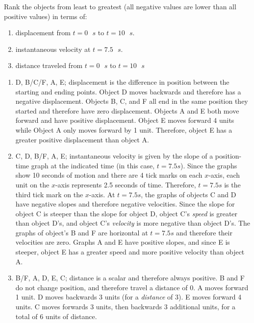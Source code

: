 \begin{Exercise}[label = graphs]
Rank the objects from least to greatest (all negative values are lower than 
all positive values) in terms of:
\begin{enumerate}
    \item displacement from $t = 0\text{ }s$ to $t = 10\text{ }s$.
    \item instantaneous velocity at $t = 7.5\text{ }s$.
    \item {}distance traveled from $t = 0\text{ }s$ to $t = 10\text{ }s$
\end{enumerate}
\end{Exercise}

\begin{Answer}[ref = graphs]
\begin{enumerate}
	\item D, B/C/F, A, E; displacement is the difference in position between the 
	starting and ending points. Object D moves backwards and therefore has a 
	negative displacement. Objects B, C, and F all end in the same position they 
	started and therefore have zero displacement. Objects A and E both move 
	forward and have positive displacement. Object E moves forward 4 units while 
	Object A only moves forward by 1 unit. Therefore, object E has a greater 
	positive displacement than object A.  
	\item C, D, B/F, A, E; instantaneous velocity is given by the slope of a 
	position-time graph at the indicated time (in this case, $t = 7.5s$). Since 
	the graphs show 10 seconds of motion and there are 4 tick marks on each 
	$x$-axis, each unit on the $x$-axis represents 2.5 seconds of time. Therefore, 
	$t = 7.5s$ is the third tick mark on the $x$-axis. At $t = 7.5s$, the graphs of 
	objects C and D have negative slopes and therefore negative velocities. Since 
	the slope for object C is steeper than the slope for object D, object C's 
	\textit{speed} is greater than object D's, and object C's \textit{velocity} 
	is more negative than object D's. The graphs of object's B and F are horizontal 
	at $t=7.5s$ and therefore their velocities are zero. Graphs A and E have 
	positive slopes, and since E is steeper, object E has a greater speed and 
	more positive velocity than object A. 
	\item B/F, A, D, E, C; distance is a scalar and therefore always positive. B 
	and F do not change position, and therefore travel a distance of 0. A moves 
	forward 1 unit. D moves backwards 3 units (for a \textit{distance} of 3). E 
	moves forward 4 units. C moves forwards 3 units, then backwards 3 additional 
	units, for a total of 6 units of distance. 
\end{enumerate}
\end{Answer}


